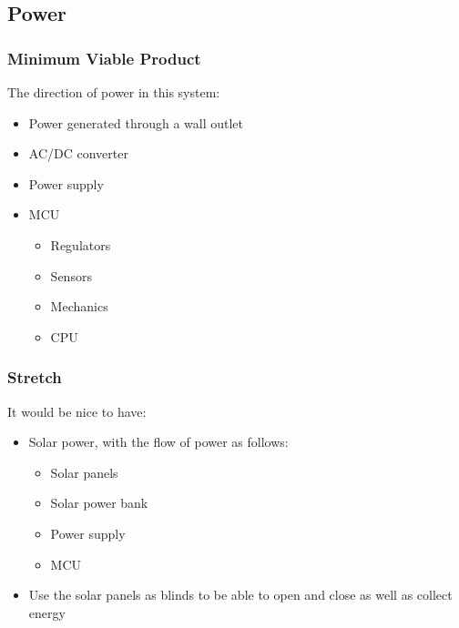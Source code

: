 \subsection{Power}
\subsubsection{Minimum Viable Product}
The direction of power in this system:
\begin{itemize}
  \item Power generated through a wall outlet
  \item AC/DC converter 
  \item Power supply
  \item MCU
  \begin{itemize}
    \item Regulators
    \item Sensors
    \item Mechanics
    \item CPU
  \end{itemize}
\end{itemize}
\subsubsection{Stretch}
It would be nice to have:
\begin{itemize}
  \item Solar power, with the flow of power as follows:
  \begin{itemize}
    \item Solar panels 
    \item Solar power bank 
    \item Power supply 
    \item MCU
  \end{itemize}
  \item Use the solar panels as blinds to be able to open and close as well as collect energy
\end{itemize}
